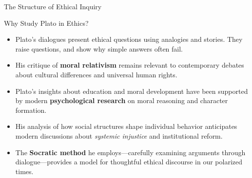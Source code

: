 \documentclass[aspectratio=169]{beamer}
\begin{document}
\begin{frame}{The Structure of Ethical Inquiry}
\begin{center}
\end{center}
\end{frame}

\begin{frame}{Why Study Plato in Ethics?}
\begin{itemize}
\item Plato's dialogues present ethical questions using analogies and stories. They raise questions, and show why simple answers often fail.
\item His critique of \textbf{moral relativism} remains relevant to contemporary debates about cultural differences and universal human rights.
\item Plato's insights about education and moral development have been supported by modern \textbf{psychological research} on moral reasoning and character formation.
\item His analysis of how social structures shape individual behavior anticipates modern discussions about \emph{systemic injustice} and institutional reform.
\item The \textbf{Socratic method} he employs—carefully examining arguments through dialogue—provides a model for thoughtful ethical discourse in our polarized times.
\end{itemize}
\end{frame}
\end{document}
